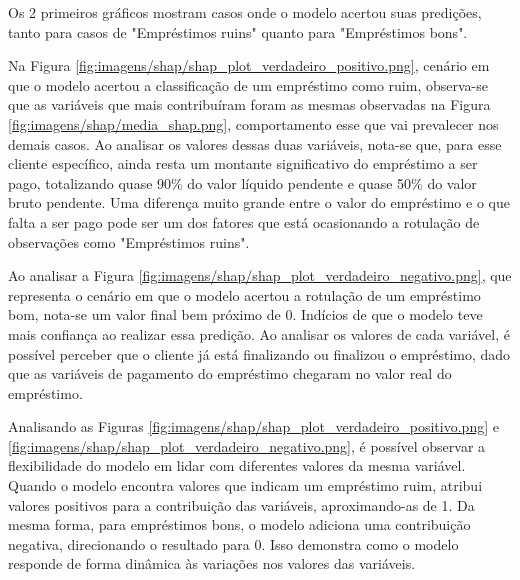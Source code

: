 Os 2 primeiros gráficos mostram casos onde o modelo acertou suas predições, tanto para casos de "Empréstimos ruins" quanto para 
"Empréstimos bons".


Na Figura \ref{fig:imagens/shap/shap_plot_verdadeiro_positivo.png}, cenário em que o modelo acertou a classificação de 
um empréstimo como ruim, observa-se que as variáveis que mais contribuíram foram as mesmas observadas na Figura \ref{fig:imagens/shap/media_shap.png}, 
comportamento esse que vai prevalecer nos demais casos.
Ao analisar os valores dessas duas variáveis, nota-se que, para esse cliente específico, ainda resta um montante significativo do empréstimo a ser pago, 
totalizando quase 90\% do valor líquido pendente e quase 50\% do valor bruto pendente. Uma diferença muito grande
entre o valor do empréstimo e o que falta a ser pago pode ser um dos fatores que está ocasionando a rotulação de observações
como "Empréstimos ruins". 


Ao analisar a Figura \ref{fig:imagens/shap/shap_plot_verdadeiro_negativo.png}, que representa o cenário em que o modelo
acertou a rotulação de um empréstimo bom, nota-se um valor final bem próximo de  0. Indícios 
de que o modelo teve mais confiança ao realizar essa predição. 
Ao analisar os valores de cada variável, é possível perceber que o cliente já está finalizando ou finalizou o empréstimo,
dado que as variáveis de pagamento do empréstimo chegaram no valor real do empréstimo.


Analisando as Figuras \ref{fig:imagens/shap/shap_plot_verdadeiro_positivo.png} e \ref{fig:imagens/shap/shap_plot_verdadeiro_negativo.png},
é possível observar a 
flexibilidade do modelo em lidar com diferentes valores da mesma variável. Quando o modelo encontra valores que indicam um 
empréstimo ruim, atribui valores positivos para a contribuição das variáveis, aproximando-as de 1. Da mesma forma, para 
empréstimos bons, o modelo adiciona uma contribuição negativa, direcionando o resultado para 0. Isso demonstra como o modelo 
responde de forma dinâmica às variações nos valores das variáveis.




